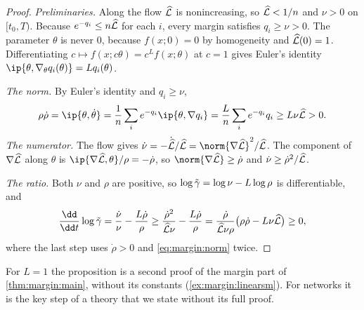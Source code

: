 \begin{refsection}
\begin{proof}
\emph{Preliminaries.} Along the flow $\widehat{\mathcal{L}}$ is nonincreasing, so $\widehat{\mathcal{L}}<1/n$ and $\nu>0$ on $[t_0,T)$. Because $e^{-q_i}\le n\widehat{\mathcal{L}}$ for each $i$, every margin satisfies $q_i\ge\nu>0$. The parameter $\theta$ is never $0$, because $f(x;0)=0$ by homogeneity and $\widehat{\mathcal{L}}(0)=1$. Differentiating $c\mapsto f(x;c\theta)=c^Lf(x;\theta)$ at $c=1$ gives Euler's identity $\ip{\theta,\nabla_\theta q_i(\theta)}=Lq_i(\theta)$.

\emph{The norm.} By Euler's identity and $q_i\ge\nu$,
\begin{equation}\label{eq:margin:norm}
  \rho\dot\rho=\ip{\theta,\dot\theta}=\frac1n\sum_ie^{-q_i}\ip{\theta,\nabla q_i}=\frac Ln\sum_ie^{-q_i}q_i\ge L\nu\Lhat>0 .
\end{equation}
\emph{The numerator.} The flow gives $\dot\nu=-\dot{\Lhat}/\Lhat=\norm{\nabla\Lhat}^2/\Lhat$. The component of $\nabla\widehat{\mathcal{L}}$ along $\theta$ is $\ip{\nabla\Lhat,\theta}/\rho=-\dot\rho$, so $\norm{\nabla\Lhat}\ge\dot\rho$ and $\dot\nu\ge\dot\rho^2/\widehat{\mathcal{L}}$.

\emph{The ratio.} Both $\nu$ and $\rho$ are positive, so $\log\tilde\gamma=\log\nu-L\log\rho$ is differentiable, and
\[
  \frac{\dd}{\dd t}\log\marginsm=\frac{\dot\nu}\nu-\frac{L\dot\rho}\rho\ge\frac{\dot\rho^2}{\Lhat\nu}-\frac{L\dot\rho}\rho=\frac{\dot\rho}{\Lhat\nu\rho}\bigl(\rho\dot\rho-L\nu\Lhat\bigr)\ge0,
\]
where the last step uses $\dot\rho>0$ and \eqref{eq:margin:norm} twice.
\end{proof}

For $L=1$ the proposition is a second proof of the margin part of \cref{thm:margin:main}, without its constants (\cref{ex:margin:linearsm}). For networks it is the key step of a theory that we state without its full proof.


\end{refsection}
